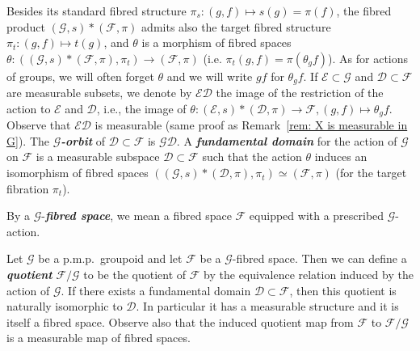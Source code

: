 \documentclass[AHL,Unicode,longabstracts,published]{cedram}
\newcommand{\defin}[1]{\textbf{\emph{#1}}}
\newcommand{\coarse}{\mathcal{E}}
\newcommand{\cg}{\mathcal{G}}
\newcommand{\cf}{\mathcal{F}}
\newcommand{\cd}{\mathcal{D}}
\newcommand{\pmp}{p.m.p.\ }
\begin{document}
Besides its standard fibred structure $\pi_s:(g,f)\mapsto s(g)=\pi(f)$, the fibred product $(\cg,s) \ast (\cf,\pi)$ admits also the target fibred structure $\pi_t:(g,f)\mapsto t(g)$, and $\theta$ is a morphism of fibred spaces $\theta:((\cg,s) \ast (\cf,\pi), \pi_t) \to (\cf,\pi)$ (i.e. $\pi_t(g,f)=\pi(\theta_g f)$). As for actions of groups, we will often forget $\theta$ and we will write $gf$ for $\theta_g f$. If $\coarse \subset \cg$ and $\cd \subset \cf$ are measurable subsets, we denote by $\coarse \cd$ the image of the restriction of the action to $\coarse$ and $\cd$, i.e., the image of $\theta:(\coarse,s)*(\cd, \pi)\rightarrow \cf, (g,f)\mapsto \theta_g f$. Observe that $\coarse \cd$ is measurable (same proof as Remark~\ref{rem: X is measurable in G}). The
\defin{$\cg$-orbit} of $\cd \subset \cf$ is $\cg \cd$. A
\defin{fundamental domain} for the action of $\cg$ on $\cf$ is a measurable subspace $\cd \subset \cf$ such that the action $\theta$ induces an isomorphism of fibred spaces $\left(\left(\cg,s\right)*\left(\cd, \pi\right), \pi_t\right)\simeq (\cf, \pi)$ (for the target fibration $\pi_t$).

By a $\cg$-\defin{fibred space}, we mean a fibred space $\cf$ equipped with a prescribed $\cg$-action.

\begin{rema}\label{ex:quotient fibred}
Let $\cg$ be a \pmp groupoid and let $\cf$ be a $\cg$-fibred space. Then we can define a \defin{quotient} $\cf/\cg$ to be the quotient of $\cf$ by the equivalence relation induced by the action of $\cg$. If there exists a fundamental domain $\cd\subset \cf$, then this quotient is naturally isomorphic to $\cd$. In particular it has a measurable structure and it is itself a fibred space. Observe also that the induced quotient map from $\cf$ to $\cf/\cg$ is a measurable map of fibred spaces.
\end{rema}
\end{document}
